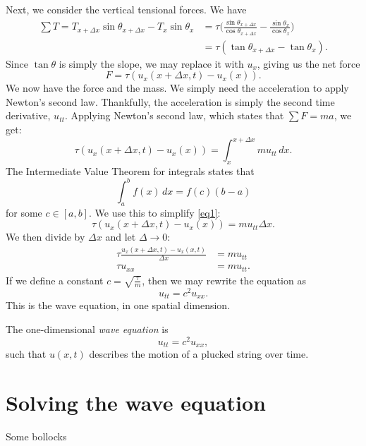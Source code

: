 \documentclass{amsart}
\begin{document}
  Next, we consider the vertical tensional forces. We have 
  \begin{align*}
    \sum T = T_{x+\Delta x} \sin \theta_{x+\Delta x} - T_{x} \sin \theta_{x} &= \tau \Big(\frac{\sin \theta_{x+\Delta x}}{\cos \theta_{x+\Delta x}} - \frac{\sin \theta_x}{\cos \theta_x} \Big) \\
                                                                             &= \tau (\tan \theta_{x + \Delta x} - \tan \theta_{x}).
  \end{align*}
  Since $\tan \theta$ is simply the slope, we may replace it with $u_x$, giving us the net force \[
    F = \tau (u_{x}(x+\Delta x, t) - u_{x}(x))
  .\] 
  We now have the force and the mass. We simply need the acceleration to apply Newton's second law. Thankfully, the acceleration is simply the second time derivative, $u_{tt}$. Applying Newton's second law, which states that $\sum F = ma$, we get:
  \begin{equation}\label{eq1}
    \tau (u_{x}(x+\Delta x, t) - u_{x}(x)) = \int_{x}^{x+\Delta x} mu_{tt}\, dx . 
  \end{equation}
  The Intermediate Value Theorem for integrals states that \[
    \int_{a}^{b} f(x)\, dx = f(c)(b-a)
  \] for some $c \in [a, b]$. We use this to simplify \ref{eq1}: 
  \[
    \tau (u_{x}(x+\Delta x, t) - u_{x}(x)) = mu_{tt}\Delta x
  .\] We then divide by $\Delta x$ and let $\Delta \to 0$:
  \begin{align*}
    \tau \frac{u_x(x+\Delta x, t) - u_{x}(x, t)}{\Delta x} &= mu_{tt} \\
    \tau u_{xx} &= mu_{tt}.
  \end{align*}
  If we define a constant $c = \sqrt{\frac{\tau}{m}} $, then we may rewrite the equation as \[
    u_{tt} = c^2 u_{xx}
  .\] This is the wave equation, in one spatial dimension.
  \begin{definition}
    The one-dimensional \emph{wave equation} is \[
      u_{tt} = c^2u_{xx}
    ,\] such that $u(x, t)$ describes the motion of a plucked string over time.
  \end{definition}

  \section{Solving the wave equation}

  Some bollocks
\end{document}
